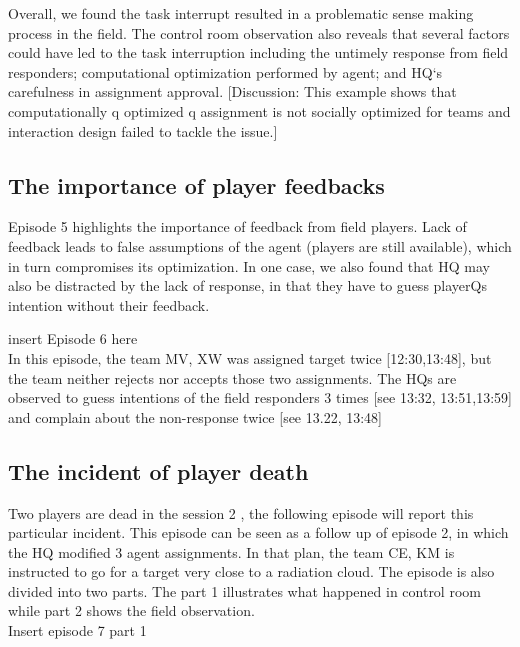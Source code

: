 Overall, we found the task interrupt resulted in a problematic sense making process in the field. The control room observation also reveals that several factors could have led to the task interruption including the untimely response from field responders; computational optimization performed by agent; and HQ`s carefulness in assignment approval. [Discussion: This example shows that computationally q optimized q assignment is not socially optimized for teams and interaction design failed to tackle the issue.]\\

\subsection{The importance of player feedbacks}
Episode 5 highlights the importance of feedback from field players. Lack of feedback leads to false assumptions of the agent (players are still available), which in turn compromises its optimization. In one case, we also found that HQ may also be distracted by the lack of response, in that they have to guess playerQs intention without their feedback. 

insert Episode 6 here \\ 

In this episode, the team MV, XW was assigned target twice [12:30,13:48], but the team neither rejects nor accepts those two assignments. The HQs are observed to guess intentions of the field responders 3 times [see 13:32, 13:51,13:59] and complain about the non-response twice [see 13.22, 13:48]

\subsection{The incident of player death}
Two players are dead in the session 2 , the following episode will report this particular incident. This episode can be seen as a follow up of episode 2, in which the HQ modified 3 agent assignments. In that plan, the team CE, KM is instructed to go for a target very close to a radiation cloud. The episode is also divided into two parts. The part 1 illustrates what happened in control room while part 2 shows the field observation.\\

Insert episode 7 part 1 \\

